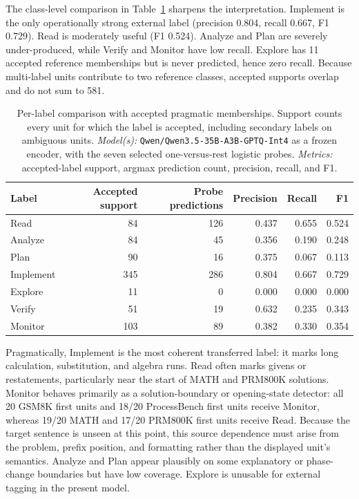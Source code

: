 \documentclass[manuscript,screen,review]{jair}
\newcommand{\modelmetrics}[2]{\textit{Model(s):} #1. \textit{Metrics:} #2.}
\begin{document}
The class-level comparison in Table~\ref{tab:schoenfeld-pragmatic-labels}
sharpens the interpretation.  Implement is the only operationally strong
external label (precision 0.804, recall 0.667, F1 0.729).  Read is moderately
useful (F1 0.524).  Analyze and Plan are severely under-produced, while
Verify and Monitor have low recall.  Explore has 11 accepted reference
memberships but is never predicted, hence zero recall.  Because multi-label
units contribute to two reference classes, accepted supports overlap and do
not sum to 581.

\begin{table}[t]
\centering
\caption{Per-label comparison with accepted pragmatic memberships.  Support
counts every unit for which the label is accepted, including secondary labels
on ambiguous units.  \modelmetrics{
\texttt{Qwen/Qwen3.5-35B-A3B-GPTQ-Int4} as a frozen encoder, with the seven
selected one-versus-rest logistic probes}{accepted-label support, argmax
prediction count, precision, recall, and F1}}
\label{tab:schoenfeld-pragmatic-labels}
\begin{tabular}{lrrrrr}
\toprule
Label & Accepted support & Probe predictions & Precision & Recall & F1 \\
\midrule
Read      &  84 & 126 & 0.437 & 0.655 & 0.524 \\
Analyze   &  84 &  45 & 0.356 & 0.190 & 0.248 \\
Plan      &  90 &  16 & 0.375 & 0.067 & 0.113 \\
Implement & 345 & 286 & 0.804 & 0.667 & 0.729 \\
Explore   &  11 &   0 & 0.000 & 0.000 & 0.000 \\
Verify    &  51 &  19 & 0.632 & 0.235 & 0.343 \\
Monitor   & 103 &  89 & 0.382 & 0.330 & 0.354 \\
\bottomrule
\end{tabular}
\end{table}

Pragmatically, Implement is the most coherent transferred label: it marks
long calculation, substitution, and algebra runs.  Read often marks givens or
restatements, particularly near the start of MATH and PRM800K solutions.
Monitor behaves primarily as a solution-boundary or opening-state detector:
all 20 GSM8K first units and 18/20 ProcessBench first units receive Monitor,
whereas 19/20 MATH and 17/20 PRM800K first units receive Read.  Because the
target sentence is unseen at this point, this source dependence must arise
from the problem, prefix position, and formatting rather than the displayed
unit's semantics.  Analyze and Plan appear plausibly on some explanatory or
phase-change boundaries but have low coverage.  Explore is unusable for
external tagging in the present model.
\end{document}
